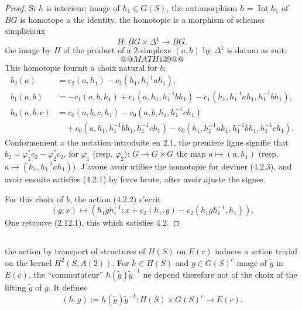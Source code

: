 \documentclass[11pt,a4paper]{article}
\theoremstyle{plain}
\theoremstyle{definition}
\DeclareMathOperator{\Int}{Int}
\begin{document}
\begin{proof}
Si $h$ is interieur: image of $h_1 \in G(S)$, the automorphism $h = \Int h_1$ of $BG$ is homotope a the identity. the homotopie is a morphism of schemes simpliciaux
\[
H : BG \times \Delta^1 \to BG.
\]
the image by $H$ of the product of a 2-simplexe $(a, b)$ by $\Delta^1$ is datum as suit:
\[
@@MATH139@@
\]
This homotopie fournit a choix natural for $b$:
\begin{equation}\label{4.2.3}
\begin{aligned}
b_2(a) &= c_2(a, h_1) - c_2(h_1, h_1^{-1} a h_1), \\
b_1(a, b) &= -c_1(a, b, h_1) + c_1(a, h_1, h_1^{-1} b h_1) - c_1(h_1, h_1^{-1} a h_1, h_1^{-1} b h_1), \\
b_0(a, b, c) &= c_0(a, b, c, h_1) - c_0(a, b, h_1, h_1^{-1} c h_1) \\
&\quad + c_0(a, h_1, h_1^{-1} b h_1, h_1^{-1} c h_1) - c_0(h_1, h_1^{-1} a h_1, h_1^{-1} b h_1, h_1^{-1} c h_1).
\end{aligned}
\end{equation}
Conformement a the notation introduite en 2.1, the premiere ligne signifie that $b_2 = \varphi_1^* c_2 - \varphi_2^* c_2$, for $\varphi_1$ (resp. $\varphi_2$): $G \to G \times G$ the map $a \mapsto (a, h_1)$ (resp. $a \mapsto (h_1, h_1^{-1} a h_1)$). J'avoue avoir utilise the homotopie for deviner (4.2.3), and avoir ensuite satisfies (4.2.1) by force brute, after avoir ajuste the signes.

For this choix of $b$, the action (4.2.2) s'ecrit
\begin{equation}\label{4.2.4}
(g; x) \mapsto (h_1 g h_1^{-1}; x + c_2(h_1, g) - c_2(h_1 g h_1^{-1}, h_1)).
\end{equation}
One retrouve (2.12.1), this which satisfies 4.2.
\end{proof}

\subsection{}\label{4.3}

the action by transport of structures of $H(S)$ on $E(c)$ induces a action trivial on the kernel $H^2(S, A(2))$. For $h \in H(S)$ and $g \in G(S)^c$ image of $\tilde{g}$ in $E(c)$, the ``commutateur'' $h(\tilde{g}) \tilde{g}^{-1}$ ne depend therefore not of the choix of the lifting $\tilde{g}$ of $g$. It defines
\begin{equation}\label{4.3.1}
(h, g) := h(\tilde{g}) \tilde{g}^{-1} : H(S) \times G(S)^c \to E(c).
\end{equation}
\end{document}
